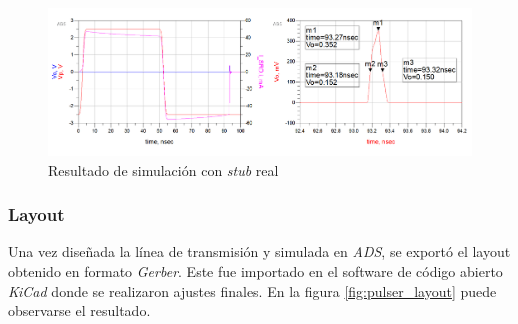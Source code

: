 \begin{figure}[tbp]
    \centering
    \includegraphics[width=\textwidth]{images/real_stub_simulation_result.png}
    \caption{Resultado de simulación con \textit{stub} real}
    \label{fig:real_stub_simulation_result}
\end{figure}

\subsubsection{Layout}

Una vez diseñada la línea de transmisión y simulada en \textit{ADS}, se exportó
el layout obtenido en formato \textit{Gerber}. Este fue importado en el software
de código abierto \textit{KiCad} donde se realizaron ajustes finales. En la
figura \ref{fig:pulser_layout} puede observarse el resultado.


